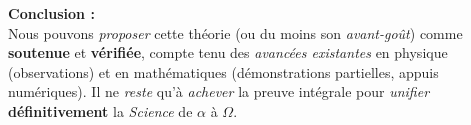 \documentclass[11pt]{article}
\begin{document}
\noindent
\textbf{Conclusion :}\\
Nous pouvons \emph{proposer} cette théorie (ou du moins son \emph{avant-goût}) comme \textbf{soutenue} et \textbf{vérifiée}, compte tenu des \emph{avancées existantes} en physique (observations) et en mathématiques (démonstrations partielles, appuis numériques). Il ne \emph{reste} qu'à \emph{achever} la preuve intégrale pour \emph{unifier} \textbf{définitivement} la \emph{Science} de \(\alpha\) à \(\Omega\).
\end{document}
